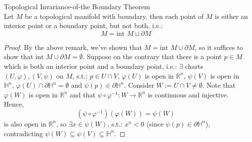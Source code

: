 \begin{theorem}{Topological Invariance-of-the Boundary Theorem}\\
Let $M$ be a topological manifold with boundary, then each point of $M$ is either an interior point or a boundary point, but not both, i.e.:
\[
M= \text{int }M \sqcup \partial M
\]
\end{theorem}

\begin{proof}
    By the above remark, we've shown that $M= \text{int }M \cup \partial M$, so it suffices to show that $\text{int }M \cup \partial M=\emptyset$. Suppose on the contrary that there is a point $p \in M$ which is both an interior point and a boundary point, i.e.: $\exists$ charts $(U,\varphi), (V,\psi)$ on $M$, s.t.: $p\in U\cap V$, $\varphi(U)$ is open in $\mathbb{R}^n$, $\psi(V)$ is open in $\mathbb{H}^n$, $\varphi(U) \cap \partial \mathbb{H}^n=\emptyset$ and $\psi(p) \in \partial \mathbb{H}^n$. Consider $W:= U\cap V \neq \emptyset$. Note that $\varphi(W)$ is open in $\mathbb{R}^n$ and that $\psi \circ \varphi^{-1}: W\to \mathbb{R}^n$ is continuous and injective. Hence,
    \[
    (\psi\circ \varphi^{-1}) (\varphi(W))= \psi(W)
    \]
    is also open in $\mathbb{R}^n$, so $\exists x\in \psi (W)$, s.t.: $x^n<0$ (since $\psi(p) \in \partial \mathbb{H}^n$), contradicting $\psi (W)\subseteq \psi(V) \subseteq \mathbb{H}^n$.
\end{proof}

